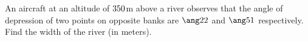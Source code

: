 

\va\vc
{}\vb\vd
\DEGREESTAN\vc\vm
\DEGREESTAN\vd\vn
\ROUND[2]\vm\vx
\ROUND[2]\vn\vy
\ADD\vx\vy\vz
\MULTIPLY\vh\vz\vv
\ROUND[2]\vv\vw

\question[2] An aircraft at an altitude of $350$m above a river observes that the angle 
of depression of two points on opposite banks are $\ang\va$ and $\ang\vb$ respectively.
Find the width of the river (in meters).

\watchout

